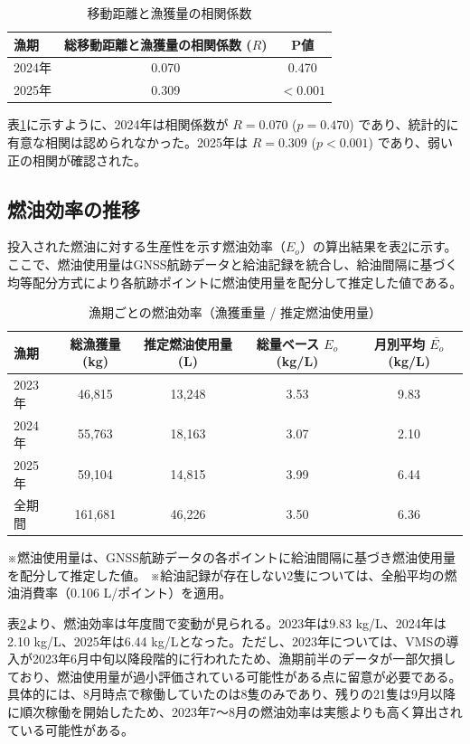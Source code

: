 \begin{table}[htbp]
  \centering
  \caption{移動距離と漁獲量の相関係数}
  \label{tab:correlation}
  \begin{tabular}{lcc}
    \hline
    漁期 & 総移動距離と漁獲量の相関係数 ($R$) & P値 \\
    \hline
    2024年 & 0.070 & 0.470 \\
    2025年 & 0.309 & $< 0.001$ \\
    \hline
  \end{tabular}
\end{table}

表\ref{tab:correlation}に示すように、2024年は相関係数が $R=0.070$ ($p=0.470$) であり、統計的に有意な相関は認められなかった。2025年は $R=0.309$ ($p < 0.001$) であり、弱い正の相関が確認された。

\subsection{燃油効率の推移}
投入された燃油に対する生産性を示す燃油効率（$E_o$）の算出結果を表\ref{tab:fuel_efficiency}に示す。ここで、燃油使用量はGNSS航跡データと給油記録を統合し、給油間隔に基づく均等配分方式により各航跡ポイントに燃油使用量を配分して推定した値である。

\begin{table}[H]
  \centering
  \caption{漁期ごとの燃油効率（漁獲重量 / 推定燃油使用量）}
  \label{tab:fuel_efficiency}
  \begin{tabular}{lcccc}
    \hline
    漁期 & 総漁獲量 (kg) & 推定燃油使用量 (L) & 総量ベース $E_o$ (kg/L) & 月別平均 $\bar{E_o}$ (kg/L) \\
    \hline
    2023年 & 46,815 & 13,248 & 3.53 & 9.83 \\
    2024年 & 55,763 & 18,163 & 3.07 & 2.10 \\
    2025年 & 59,104 & 14,815 & 3.99 & 6.44 \\
    \hline
    全期間 & 161,681 & 46,226 & 3.50 & 6.36 \\
    \hline
  \end{tabular}
  \begin{flushleft}
    \small
    ※燃油使用量は、GNSS航跡データの各ポイントに給油間隔に基づき燃油使用量を配分して推定した値。
    ※給油記録が存在しない2隻については、全船平均の燃油消費率（0.106 L/ポイント）を適用。
  \end{flushleft}
\end{table}

表\ref{tab:fuel_efficiency}より、燃油効率は年度間で変動が見られる。2023年は9.83 kg/L、2024年は2.10 kg/L、2025年は6.44 kg/Lとなった。ただし、2023年については、VMSの導入が2023年6月中旬以降段階的に行われたため、漁期前半のデータが一部欠損しており、燃油使用量が過小評価されている可能性がある点に留意が必要である。具体的には、8月時点で稼働していたのは8隻のみであり、残りの21隻は9月以降に順次稼働を開始したため、2023年7〜8月の燃油効率は実態よりも高く算出されている可能性がある。

